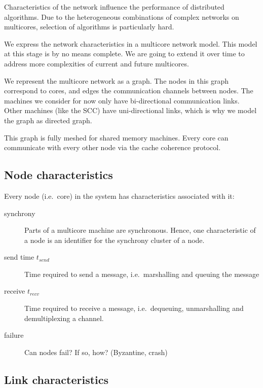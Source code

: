 \documentclass{article}
\begin{document}
Characteristics of the network influence the performance of
distributed algorithms. Due to the heterogeneous combinations of
complex networks on multicores, selection of algorithms is
particularly hard.

We express the network characteristics in a multicore network
model. This model at this stage is by no means complete. We are going to
extend it over time to address more complexities of current and future
multicores.

We represent the multicore network as a graph. The nodes in this graph
correspond to cores, and edges the communication channels between
nodes. The machines we consider for now only have bi-directional
communication links. Other machines (like the SCC) have
uni-directional links, which is why we model the graph as directed
graph.

This graph is fully meshed for shared memory machines. Every core can
communicate with every other node via the cache coherence protocol.

\subsection{Node characteristics} 
\label{sec:model_nodes}

Every node (i.e.\ core) in the system has characteristics associated
with it:

\begin{description}
\item[synchrony] Parts of a multicore machine are synchronous. Hence,
  one characteristic of a node is an identifier for the synchrony
  cluster of a node.
\item[send time $t_{send}$] Time required to send a message, i.e.\ marshalling
  and queuing the message
\item[receive $t_{recv}$] Time required to receive a message, i.e.\
  dequeuing, unmarshalling and demultiplexing a channel.
\item[failure] Can nodes fail? If so, how? (Byzantine, crash)
\end{description}

\subsection{Link characteristics} 
\label{sec:model_links}
\end{document}
